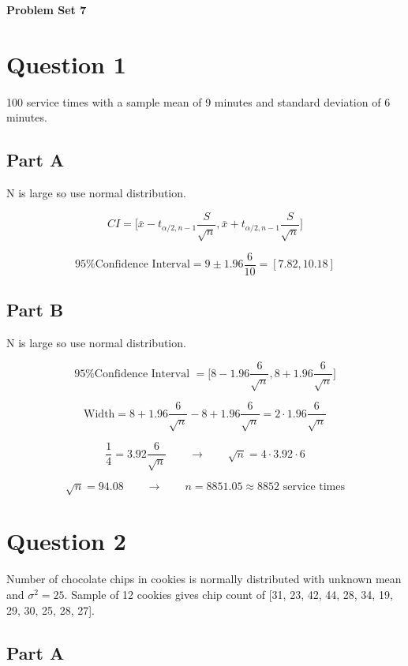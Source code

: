 \documentclass[letterpaper]{article}
\begin{document}
\vspace*{6pt}

\noindent \textbf{\huge{Problem Set 7}}

\bigskip

\section*{Question 1}

100 service times with a sample mean of 9 minutes and standard deviation of 6 minutes.

\subsection*{Part A}

N is large so use normal distribution.

$$CI = \Big[ \bar{x} - t_{\alpha/2, n-1} \frac{S}{\sqrt{n}}, \bar{x} + t_{\alpha/2, n-1} \frac{S}{\sqrt{n}}\Big]$$

$$\text{95\% Confidence Interval} = 9 \pm 1.96 \frac{6}{10} = [7.82, 10.18]$$

\subsection*{Part B}

N is large so use normal distribution.

$$\text{95\% Confidence Interval } = \Big[ 8 - 1.96 \frac{6}{\sqrt{n}}, 8 + 1.96 \frac{6}{\sqrt{n}} \Big]$$

$$\text{Width} = 8 + 1.96 \frac{6}{\sqrt{n}} - 8 + 1.96 \frac{6}{\sqrt{n}} = 2 \cdot 1.96 \frac{6}{\sqrt{n}}$$

$$\frac{1}{4} = 3.92 \frac{6}{\sqrt{n}} \qquad \longrightarrow \qquad \sqrt{n} = 4 \cdot 3.92 \cdot 6$$

$$\sqrt{n} = 94.08 \qquad \longrightarrow \qquad n = 8851.05 \approx 8852 \text{ service times}$$

\newpage

\section*{Question 2}

Number of chocolate chips in cookies is normally distributed with unknown mean and $\sigma^2 = 25$. Sample of 12 cookies gives chip count of [31, 23, 42, 44, 28, 34, 19, 29, 30, 25, 28, 27].

\subsection*{Part A}
\end{document}
